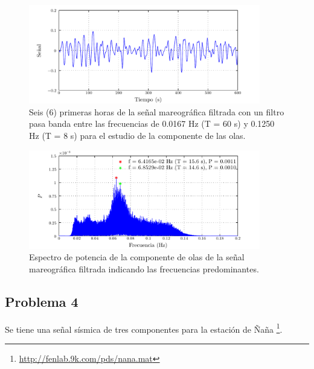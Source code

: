 \documentclass[a4paper,12pt,final]{article}
\begin{document}
      \begin{figure}[H]
        \begin{center}
          \caption{Seis (6) primeras horas de la señal mareográfica filtrada con un filtro pasa banda entre las frecuencias de 0.0167 Hz (T = 60 s) y 0.1250 Hz (T = 8 s) para el estudio de la componente de las olas.}
          \label{p3f8}
          \vspace{-1em}
          \includegraphics[width=0.9\textwidth]{./laboratorio_5/problema03_signal_waves.pdf}
        \end{center}
      \end{figure}
      \vspace{-0.25em}

      \begin{figure}[H]
        \begin{center}
          \caption{Espectro de potencia de la componente de olas de la señal mareográfica filtrada indicando las frecuencias predominantes.}
          \label{p3f9}
          \vspace{-1em}
          \includegraphics[width=0.9\textwidth]{./laboratorio_5/problema03_power_spectrum_waves.pdf}
        \end{center}
      \end{figure}
      \vfill

  \newpage
  \subsection*{Problema 4}
    \noindent Se tiene una señal sísmica de tres componentes para la estación de
      Ñaña \footnote{\url{http://fenlab.9k.com/pds/nana.mat}}.
\end{document}
